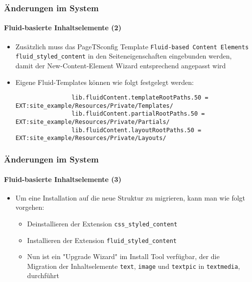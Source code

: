 \begin{frame}[fragile]
	\frametitle{Änderungen im System}
	\framesubtitle{Fluid-basierte Inhaltselemente (2)}

	\lstset{basicstyle=\tiny\ttfamily}

	\begin{itemize}

		\item Zusätzlich muss das PageTSconfig Template \texttt{Fluid-based Content Elements fluid\_styled\_content}
			in den Seiteneigenschaften eingebunden werden, damit der New-Content-Element Wizard entsprechend
			angepasst wird

		\item Eigene Fluid-Templates können wie folgt festgelegt werden:

			\begin{lstlisting}
				lib.fluidContent.templateRootPaths.50 = EXT:site_example/Resources/Private/Templates/
				lib.fluidContent.partialRootPaths.50 = EXT:site_example/Resources/Private/Partials/
				lib.fluidContent.layoutRootPaths.50 = EXT:site_example/Resources/Private/Layouts/
			\end{lstlisting}

	\end{itemize}

\end{frame}


\begin{frame}[fragile]
	\frametitle{Änderungen im System}
	\framesubtitle{Fluid-basierte Inhaltselemente (3)}

	\begin{itemize}

		\item Um eine Installation auf die neue Struktur zu migrieren, kann man wie folgt vorgehen:

			\begin{itemize}

				\item Deinstallieren der Extension \texttt{css\_styled\_content}

				\item Installieren der Extension \texttt{fluid\_styled\_content}

				\item Nun ist ein "Upgrade Wizard" im Install Tool verfügbar,
					der die Migration der Inhaltselemente \texttt{text}, \texttt{image}
					und \texttt{textpic} in \texttt{textmedia}, durchführt

			\end{itemize}
	\end{itemize}

\end{frame}


